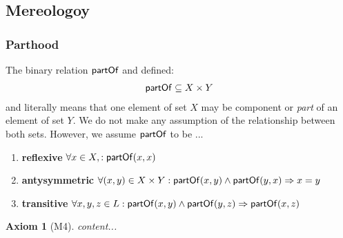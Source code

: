 \documentclass[runningheads,a4paper]{llncs}
\newtheorem{axiom}{Axiom}
\newcommand{\partOf}{\text{\textsf{partOf}}}
\begin{document}
\subsection{Mereologoy}



\subsubsection{Parthood}
\cite{DBLP:journals/dke/Varzi96}
\begin{definition}[Parthood]
The binary relation $\partOf$ and defined:
\begin{align*}
\partOf \subseteq X \times Y
\end{align*}
and literally means that one element of set $X$ may be component or \textit{part} of an element of set $Y$.
We do not make any assumption of the relationship between both sets.
However, we assume $\partOf$ to be ...
\begin{enumerate}


\item
\textbf{reflexive}
$\forall x \in X, : \partOf(x,x)$

\item
\textbf{antysymmetric}
$\forall (x,y) \in X \times Y : \partOf(x,y) \wedge \partOf(y,x) \Rightarrow x = y$


\item
\textbf{transitive}
$\forall x,y,z \in L : \partOf(x,y) \wedge \partOf(y,z) \Rightarrow \partOf(x,z)$

\end{enumerate}

\end{definition}


\begin{axiom}[M4]
content...
\end{axiom}
\end{document}
